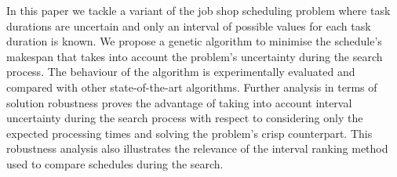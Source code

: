 
In this paper we tackle a variant of the job shop scheduling problem where task durations are uncertain and only an interval of possible values for each task duration is known. We propose a genetic algorithm to minimise the schedule's makespan that takes into account the problem's uncertainty during the search process. The behaviour of the algorithm is experimentally evaluated  and compared with other state-of-the-art algorithms. Further analysis in terms of solution robustness proves the advantage of taking into account interval uncertainty during the search process with respect to considering only the expected processing times and solving the problem's crisp counterpart. This robustness analysis also illustrates the relevance of the interval ranking method used to compare schedules during the search.

